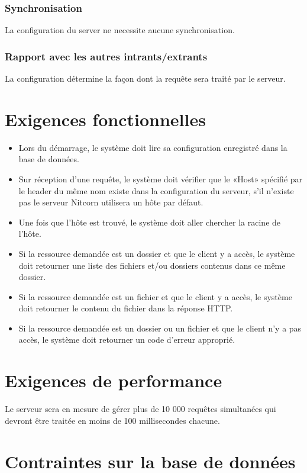\documentclass{scrreprt}
\begin{document}
\subsubsection{Synchronisation} La configuration du server ne necessite aucune synchronisation.
\subsubsection{Rapport avec les autres intrants/extrants} La configuration détermine la façon dont la requête sera traité par le serveur.
\section{Exigences fonctionnelles}
\begin{itemize}
    \item Lors du démarrage, le système doit lire sa configuration enregistré dans la base de données.
    \item Sur réception d'une requête, le système doit vérifier que le «Host» spécifié par le header du même nom existe dans la configuration du serveur, s'il n'existe pas
        le serveur Nitcorn utilisera un hôte par défaut.
    \item Une fois que l'hôte est trouvé, le système doit aller chercher la racine de l'hôte.
    \item Si la ressource demandée est un dossier et que le client y a accès, le système doit retourner une liste des fichiers et/ou dossiers contenus dans ce même dossier.
    \item Si la ressource demandée est un fichier et que le client y a accès, le système doit retourner le contenu du fichier dans la réponse HTTP.
    \item Si la ressource demandée est un dossier ou un fichier et que le client n'y a pas accès, le système doit retourner un code d'erreur approprié.
\end{itemize}
\section{Exigences de performance} Le serveur sera en mesure de gérer plus de 10 000 requêtes simultanées qui devront être traitée en moins de 100 millisecondes chacune. 
\section{Contraintes sur la base de données}
\end{document}
